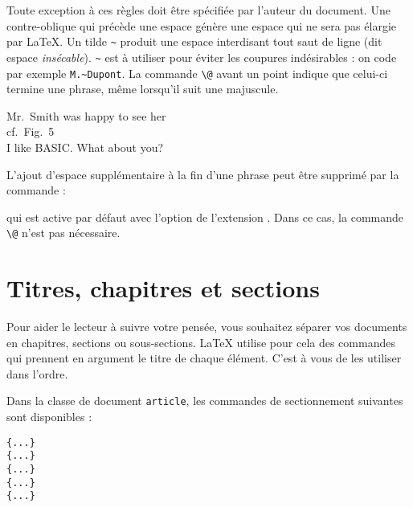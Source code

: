Toute exception à ces règles doit être spécifiée par l'auteur du
document. Une contre-oblique qui précède une espace génère une espace qui ne
sera pas élargie par \LaTeX{}.  Un tilde \og \verb|~| \fg{} produit
une espace interdisant tout saut de ligne (dit espace
\emph{insécable}).  \verb|~| est à utiliser pour éviter les coupures
indésirables : on code par exemple \verb|M.~Dupont|.  La
commande \verb|\@| avant un point indique que celui-ci termine une
phrase, même lorsqu'il suit une majuscule.
 

\begin{otherlanguage}{english}
\begin{example}
  Mr.~Smith was happy to see her\\
  cf.~Fig.~5\\
  I like BASIC\@. What about you?
\end{example}
\end{otherlanguage}

L'ajout d'espace supplémentaire à la fin d'une phrase peut être
supprimé par la commande :
\begin{lscommand}
\end{lscommand}
\noindent qui est active par défaut avec l'option  de
l'extension . Dans ce cas, la commande \verb|\@| n'est pas
nécessaire.



\section{Titres, chapitres et sections}

Pour aider le lecteur à suivre votre pensée, vous souhaitez séparer
vos documents en chapitres, sections ou sous-sections. \LaTeX{}
utilise pour cela des commandes qui prennent en argument le titre de
chaque élément. C'est à vous de les utiliser dans l'ordre.

Dans la classe de document \texttt{article}, les commandes de
sectionnement suivantes sont disponibles : \nopagebreak
\begin{lscommand}
\verb|{...}|\\
\verb|{...}|\\
\verb|{...}|\\
\verb|{...}|\\
\verb|{...}|
\end{lscommand}

